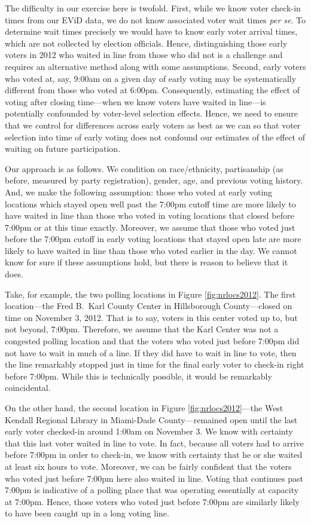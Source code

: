 \documentclass[12pt,titlepage]{article}
\begin{document}
The difficulty in our exercise here is twofold.  First, while we know
voter check-in times from our EViD data, we do not know associated
voter wait times \emph{per se}.  To determine wait times precisely we
would have to know early voter arrival times, which are not collected
by election officials.  Hence, distinguishing those early voters in
2012 who waited in line from those who did not is a challenge and
requires an alternative method along with some assumptions.  Second,
early voters who voted at, say, 9:00am on a given day of early voting
may be systematically different from those who voted at
6:00pm. Consequently, estimating the effect of voting after closing
time---when we know voters have waited in line---is potentially
confounded by voter-level selection effects.  Hence, we need to ensure
that we control for differences across early voters as best as we can
so that voter selection into time of early voting does not confound
our estimates of the effect of waiting on future participation.

Our approach is as follows.  We condition on race/ethnicity,
partisanship (as before, measured by party registration), gender, age,
and previous voting history.  And, we make the following assumption:
those who voted at early voting locations which stayed open well past
the 7:00pm cutoff time are more likely to have waited in line than
those who voted in voting locations that closed before 7:00pm or at
this time exactly.  Moreover, we assume that those who voted just
before the 7:00pm cutoff in early voting locations that stayed open
late are more likely to have waited in line than those who voted
earlier in the day.  We cannot know for sure if these assumptions
hold, but there is reason to believe that it does.

Take, for example, the two polling locations in Figure
\ref{fig:nrlocs2012}.  The first location---the Fred B.\ Karl County
Center in Hillsborough County---closed on time on November 3,
2012. That is to say, voters in this center voted up to, but not
beyond, 7:00pm.  Therefore, we assume that the Karl Center was not a
congested polling location and that the voters who voted just before
7:00pm did not have to wait in much of a line.  If they did have to
wait in line to vote, then the line remarkably stopped just in time
for the final early voter to check-in right before 7:00pm.  While this
is technically possible, it would be remarkably coincidental.

On the other hand, the second location in Figure
\ref{fig:nrlocs2012}---the West Kendall Regional Library in Miami-Dade
County---remained open until the last early voter checked-in around
1:00am on November 3.  We know with certainty that this last voter
waited in line to vote.  In fact, because all voters had to arrive
before 7:00pm in order to check-in, we know with certainty that he or
she waited at least six hours to vote.  Moreover, we can be fairly
confident that the voters who voted just before 7:00pm here also
waited in line.  Voting that continues past 7:00pm is indicative of a
polling place that was operating essentially at capacity at 7:00pm.
Hence, those voters who voted just before 7:00pm are similarly likely
to have been caught up in a long voting line.
\end{document}

